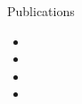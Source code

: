 
\begin{section}{Publications}
	\begin{itemize}
		\item {}
		\item {}
		\item {}
		\item {}
	\end{itemize}
\end{section}
